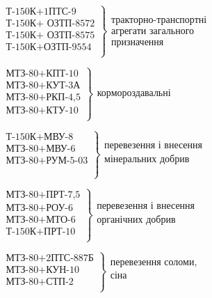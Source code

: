 \(
\left.\begin{array}{l}
\mbox{Т-150К+1ПТС-9}\\
\mbox{Т-150К+ ОЗТП-8572}\\
\mbox{Т-150К+ ОЗТП-8575}\\
\mbox{Т-150К+ОЗТП-9554}\\
\end{array}\right\}
\begin{array}{l}
\mbox{тракторно-транспортні} \\
\mbox{агрегати загального} \\
\mbox{призначення}
\end{array}
\)
		                          
\(
\left.\begin{array}{l}
\mbox{МТЗ-80+КПТ-10}\\
\mbox{МТЗ-80+КУТ-3А}\\
\mbox{МТЗ-80+РКП-4,5}\\
\mbox{МТЗ-80+КТУ-10}\\
\end{array}\right\}
\begin{array}{l}
\mbox{кормороздавальні} 
\end{array}
\)	

     
		     
\(
\left.\begin{array}{l}
\mbox{Т-150К+МВУ-8}\\
\mbox{МТЗ-80+МВУ-6}\\
\mbox{МТЗ-80+РУМ-5-03}\\
\mbox{}\\
\mbox{}\\
\end{array}\right\}
\begin{array}{l}
\mbox{перевезення і внесення} \\
\mbox{мінеральних добрив} \\
\end{array}
\)		     
	
\(
\left.\begin{array}{l}
\mbox{МТЗ-80+ПРТ-7,5}\\
\mbox{МТЗ-80+РОУ-6}\\
\mbox{МТЗ-80+МТО-6}\\
\mbox{Т-150К+ПРТ-10}\\
\end{array}\right\}
\begin{array}{l}
\mbox{перевезення і внесення} \\
\mbox{органічних добрив} \\
\end{array}
\)

 

\(
\left.\begin{array}{l}
\mbox{МТЗ-80+2ПТС-887Б}\\
\mbox{МТЗ-80+КУН-10}\\
\mbox{МТЗ-80+СТП-2}\\

\end{array}\right\}
\begin{array}{l}
\mbox{перевезення соломи,} \\
\mbox{сіна} \\
\end{array}
\)		
	
		                 
	

